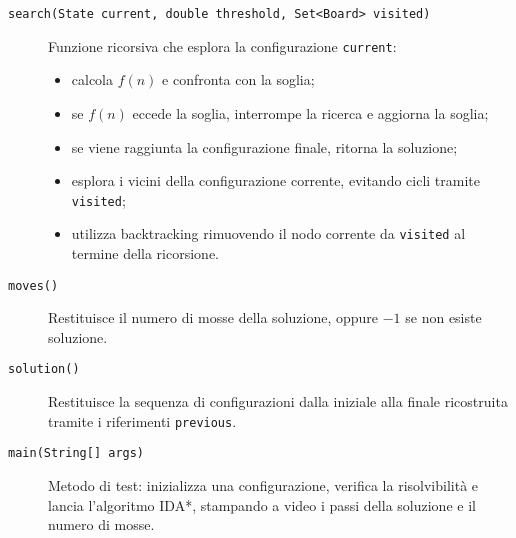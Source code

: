 \begin{description}
    \item[\texttt{search(State current, double threshold, Set<Board> visited)}]  
        Funzione ricorsiva che esplora la configurazione \texttt{current}:
        \begin{itemize}
            \item calcola $f(n)$ e confronta con la soglia;
            \item se $f(n)$ eccede la soglia, interrompe la ricerca e aggiorna la soglia;
            \item se viene raggiunta la configurazione finale, ritorna la soluzione;
            \item esplora i vicini della configurazione corrente, evitando cicli tramite \texttt{visited};
            \item utilizza backtracking rimuovendo il nodo corrente da \texttt{visited} al termine della ricorsione.
        \end{itemize}

    \item[\texttt{moves()}]  
        Restituisce il numero di mosse della soluzione, oppure $-1$ se non esiste soluzione.

    \item[\texttt{solution()}]  
        Restituisce la sequenza di configurazioni dalla iniziale alla finale ricostruita tramite i riferimenti \texttt{previous}.

    \item[\texttt{main(String[] args)}]  
        Metodo di test: inizializza una configurazione, verifica la risolvibilità e lancia l’algoritmo IDA*, stampando a video i passi della soluzione e il numero di mosse.
\end{description}
